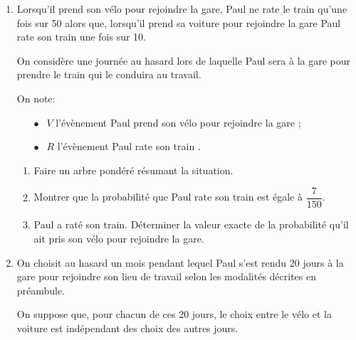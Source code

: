 \documentclass[10pt,a4paper]{article}
\begin{document}
\medskip

\begin{enumerate}
\item Lorsqu'il prend son vélo pour rejoindre la gare, Paul ne rate le train qu'une fois sur 50 alors que, lorsqu'il prend sa voiture pour rejoindre la gare Paul rate son train une fois sur 10.

On considère une journée au hasard lors de laquelle Paul sera à la gare pour prendre le train qui le conduira au travail.

On note:

\setlength\parindent{8mm}
\begin{itemize}
\item[$\bullet~~$] $V$ l'évènement \og Paul prend son vélo pour rejoindre la gare \fg{} ;
\item[$\bullet~~$] $R$ l'évènement \og Paul rate son train \fg.
\end{itemize}
\setlength\parindent{0mm}

	\begin{enumerate}
		\item Faire un arbre pondéré résumant la situation.
		\item Montrer que la probabilité que Paul rate son train est égale à $\dfrac{7}{150}$.
		\item Paul a raté son train. Déterminer la valeur exacte de la probabilité qu'il ait pris son vélo pour rejoindre la gare.
	\end{enumerate}
\item On choisit au hasard un mois pendant lequel Paul s'est rendu $20$ jours à la gare pour rejoindre son lieu de travail selon les modalités décrites en préambule.

On suppose que, pour chacun de ces 20 jours, le choix entre le vélo et
la voiture est indépendant des choix des autres jours.


\end{enumerate}
\end{document}
